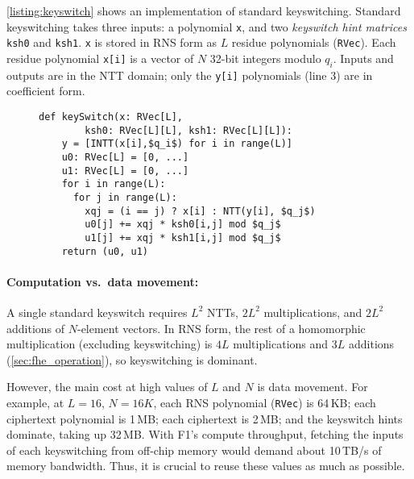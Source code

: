 \autoref{listing:keyswitch} shows an implementation of standard keyswitching.
Standard keyswitching takes three inputs: a polynomial \texttt{x}, and two
\emph{keyswitch hint matrices} \texttt{ksh0} and \texttt{ksh1}. \texttt{x} is
stored in RNS form as $L$ residue polynomials (\texttt{RVec}). Each residue
polynomial \texttt{x[i]} is a vector of $N$ 32-bit integers modulo $q_i$.
Inputs and outputs are in the NTT domain; only the \texttt{y[i]} polynomials
(line 3) are in coefficient form.


\begin{figure}
\begin{center}
  \begin{lstlisting}[caption={Standard keyswitch implementation. \texttt{RVec} is an $N$-element vector of 32-bit values, storing a single RNS polynomial in either the coefficient or the NTT domain.
    }, mathescape=true, style=custompython, label=listing:keyswitch]
  def keySwitch(x: RVec[L],
        ksh0: RVec[L][L], ksh1: RVec[L][L]):
    y = [INTT(x[i],$q_i$) for i in range(L)]
    u0: RVec[L] = [0, ...]
    u1: RVec[L] = [0, ...]
    for i in range(L):
      for j in range(L):
        xqj = (i == j) ? x[i] : NTT(y[i], $q_j$)
        u0[j] += xqj * ksh0[i,j] mod $q_j$
        u1[j] += xqj * ksh1[i,j] mod $q_j$
    return (u0, u1)
  \end{lstlisting}
\end{center}
\end{figure}

\paragraph{Computation vs.\ data movement:}
A single standard keyswitch requires $L^2$ NTTs, $2L^2$ multiplications, and
$2L^2$ additions of $N$-element \mbox{vectors}. In RNS form, the rest of a
homomorphic multiplication (excluding keyswitching) is $4L$ multiplications and
$3L$ additions (\autoref{sec:fhe_operation}), so keyswitching is dominant.

However, the main cost at high values of $L$ and $N$ is data movement. For
example, at $L = 16$, $N = 16K$, each RNS polynomial (\texttt{RVec}) is 64\,KB;
each ciphertext polynomial is 1\,MB; each ciphertext is 2\,MB; and the
keyswitch hints dominate, taking up 32\,MB. With F1's compute throughput,
fetching the inputs of each keyswitching from off-chip memory would demand
about 10\,TB/s of memory bandwidth. Thus, it is crucial to reuse these values
as much as possible.

